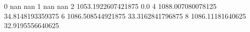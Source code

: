0 nan nan
1 nan nan
2 1053.1922607421875 0.0
4 1088.007080078125 34.8148193359375
6 1086.508544921875 33.3162841796875
8 1086.11181640625 32.9195556640625
